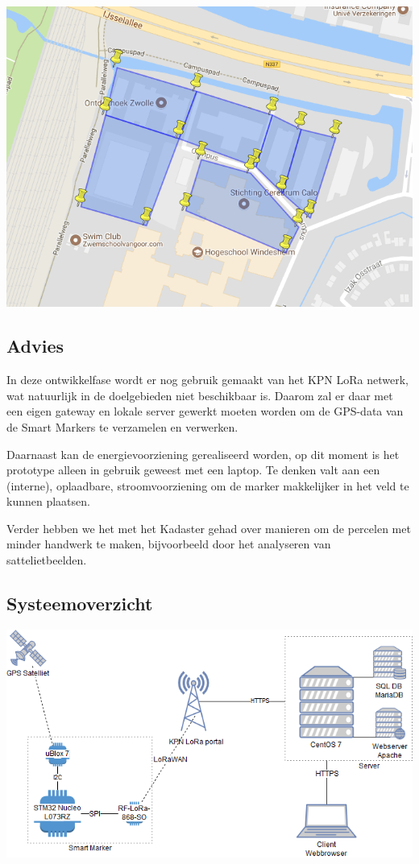 \begin{center}
\includegraphics[width=0.5\linewidth]{final_report/webpage.png}
\end{center}

\subsection{Advies}
In deze ontwikkelfase wordt er nog gebruik gemaakt van het KPN LoRa netwerk, wat
natuurlijk in de doelgebieden niet beschikbaar is. Daarom zal er daar met een
eigen gateway en lokale server gewerkt moeten worden om de GPS-data van de Smart
Markers te verzamelen en verwerken.

Daarnaast kan de energievoorziening gerealiseerd worden, op dit moment is het
prototype alleen in gebruik geweest met een laptop. Te denken valt aan een
(interne), oplaadbare, stroomvoorziening om de marker makkelijker in het veld te
kunnen plaatsen.

Verder hebben we het met het Kadaster gehad over manieren om de percelen met
minder handwerk te maken, bijvoorbeeld door het analyseren van sattelietbeelden.

\subsection{Systeemoverzicht}
\includegraphics[width=\linewidth]{final_report/system_architecture.png}

